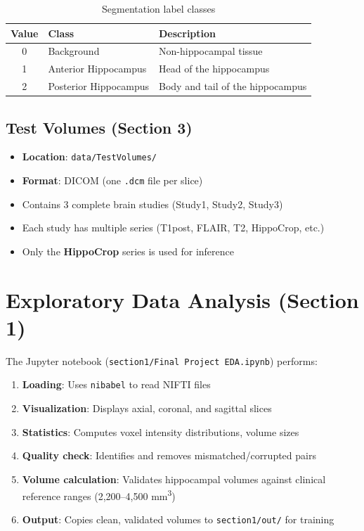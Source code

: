 \documentclass[12pt,a4paper]{report}
\begin{document}
\begin{table}[H]
\centering
\begin{tabular}{cll}
\toprule
\textbf{Value} & \textbf{Class} & \textbf{Description} \\
\midrule
0 & Background & Non-hippocampal tissue \\
1 & Anterior Hippocampus & Head of the hippocampus \\
2 & Posterior Hippocampus & Body and tail of the hippocampus \\
\bottomrule
\end{tabular}
\caption{Segmentation label classes}
\end{table}

\subsection{Test Volumes (Section 3)}
\begin{itemize}
    \item \textbf{Location}: \texttt{data/TestVolumes/}
    \item \textbf{Format}: DICOM (one \texttt{.dcm} file per slice)
    \item Contains 3 complete brain studies (Study1, Study2, Study3)
    \item Each study has multiple series (T1post, FLAIR, T2, HippoCrop, etc.)
    \item Only the \textbf{HippoCrop} series is used for inference
\end{itemize}

\section{Exploratory Data Analysis (Section 1)}

The Jupyter notebook (\texttt{section1/Final Project EDA.ipynb}) performs:

\begin{enumerate}
    \item \textbf{Loading}: Uses \texttt{nibabel} to read NIFTI files
    \item \textbf{Visualization}: Displays axial, coronal, and sagittal slices
    \item \textbf{Statistics}: Computes voxel intensity distributions, volume sizes
    \item \textbf{Quality check}: Identifies and removes mismatched/corrupted pairs
    \item \textbf{Volume calculation}: Validates hippocampal volumes against clinical reference ranges (2,200--4,500 mm\textsuperscript{3})
    \item \textbf{Output}: Copies clean, validated volumes to \texttt{section1/out/} for training
\end{enumerate}
\end{document}
